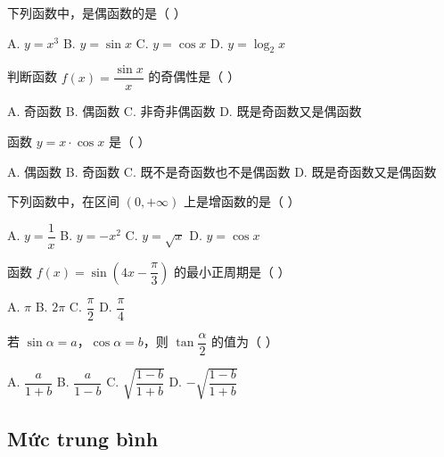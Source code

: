 \documentclass[11pt, a4paper]{article}
\begin{document}
\begin{baitap}[1]
下列函数中，是偶函数的是（ ）
\par\vspace{3pt}
\noindent A. $y = x^3$ \quad B. $y = \sin x$ \quad C. $y = \cos x$ \quad D. $y = \log_{2}x$
\end{baitap}
\begin{baitap}[2]
判断函数 $f(x) = \dfrac{\sin x}{x}$ 的奇偶性是（ ）
\par\vspace{3pt}
\noindent A. 奇函数 \quad B. 偶函数 \quad C. 非奇非偶函数 \quad D. 既是奇函数又是偶函数
\end{baitap}
\begin{baitap}[3]
函数 $y = x \cdot \cos x$ 是（ ）
\par\vspace{3pt}
\noindent A. 偶函数 \quad B. 奇函数 \quad C. 既不是奇函数也不是偶函数 \quad D. 既是奇函数又是偶函数
\end{baitap}
\begin{baitap}[4]
下列函数中，在区间 $(0, +\infty)$ 上是增函数的是（ ）
\par\vspace{3pt}
\noindent A. $y = \dfrac{1}{x}$ \quad B. $y = -x^2$ \quad C. $y = \sqrt{x}$ \quad D. $y = \cos x$
\end{baitap}
\begin{baitap}[5]
函数 $f(x) = \sin\!\left(4x - \dfrac{\pi}{3}\right)$ 的最小正周期是（ ）
\par\vspace{3pt}
\noindent A. $\pi$ \quad B. $2\pi$ \quad C. $\dfrac{\pi}{2}$ \quad D. $\dfrac{\pi}{4}$
\end{baitap}
\begin{baitap}[6]
若 $\sin\alpha = a$，$\cos\alpha = b$，则 $\tan\dfrac{\alpha}{2}$ 的值为（ ）
\par\vspace{3pt}
\noindent A. $\dfrac{a}{1+b}$ \quad B. $\dfrac{a}{1-b}$ \quad C. $\sqrt{\dfrac{1-b}{1+b}}$ \quad D. $-\sqrt{\dfrac{1-b}{1+b}}$
\end{baitap}
\subsection{Mức trung bình}
\end{document}
